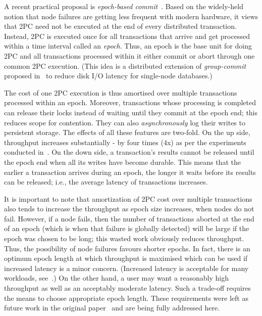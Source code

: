 A recent practical proposal is \emph{epoch-based commit}~\cite{lu}.
Based on the widely-held notion that node failures are getting less frequent with modern hardware, it views that 2PC need not be executed at the end of every distributed transaction. Instead,
2PC is executed once for all transactions that arrive and get processed within a time interval called an \emph{epoch}. Thus, an epoch is the base unit for doing 2PC and all transactions processed within it either commit or abort through one common 2PC execution.
(This idea is a distributed extension of \emph{group-commit} proposed in~\cite{dewitt} to reduce disk I/O latency for single-node databases.)

The cost of one 2PC execution is thus amortised over multiple transactions processed within an epoch. Moreover, transactions whose processing is completed can release their locks instead of waiting until they commit at the epoch end; this reduces scope for contention. They can also 
\emph{asynchronously} log their writes to persistent storage. The effects of all these features are two-fold. 
On the up side, throughput increases substantially - by four times (4x) as per the experiments conducted 
in~\cite{lu}. %
On the down side, a transaction's results cannot be released until the epoch end when all its writes have 
become durable. This means that the earlier a transaction arrives during an epoch, the longer it waits 
before its results can be released; i.e., the average latency of transactions increases. 


It is important to note that amortization of 2PC cost over multiple transactions also tends to increase the 
throughput as epoch size increases, when nodes do not fail. However, if a node fails, then the number of 
transactions aborted at the end of an epoch (which is when that failure is globally detected) will be large 
if the epoch was chosen to be long; this wasted work obviously reduces throughput. Thus, the possibility of 
node failures favours shorter epochs. In fact,  there is an optimum epoch length at which throughput is 
maximised which can be used if increased latency is a minor concern. (Increased latency is acceptable for 
many workloads, see~\cite{crooks,tu,narula}.) On the other hand, a user may want a reasonably high throughput 
as well as an acceptably moderate latency. Such a trade-off requires the means to choose appropriate epoch 
length. These requirements 
were left as future work in the original paper~\cite{lu} and are being fully addressed here. 

